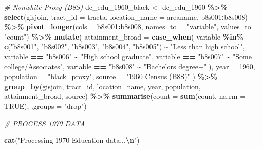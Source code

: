 \documentclass[
]{article}
\newenvironment{Shaded}{\begin{snugshade}}{\end{snugshade}}
\newcommand{\AttributeTok}[1]{\textcolor[rgb]{0.13,0.29,0.53}{#1}}
\newcommand{\CommentTok}[1]{\textcolor[rgb]{0.56,0.35,0.01}{\textit{#1}}}
\newcommand{\ConstantTok}[1]{\textcolor[rgb]{0.56,0.35,0.01}{#1}}
\newcommand{\DecValTok}[1]{\textcolor[rgb]{0.00,0.00,0.81}{#1}}
\newcommand{\FunctionTok}[1]{\textcolor[rgb]{0.13,0.29,0.53}{\textbf{#1}}}
\newcommand{\NormalTok}[1]{#1}
\newcommand{\OtherTok}[1]{\textcolor[rgb]{0.56,0.35,0.01}{#1}}
\newcommand{\SpecialCharTok}[1]{\textcolor[rgb]{0.81,0.36,0.00}{\textbf{#1}}}
\newcommand{\StringTok}[1]{\textcolor[rgb]{0.31,0.60,0.02}{#1}}
\begin{document}
\begin{Shaded}
\begin{Highlighting}[]
\CommentTok{\# Nonwhite Proxy (B8S)}
\NormalTok{dc\_edu\_1960\_black }\OtherTok{\textless{}{-}}\NormalTok{ dc\_edu\_1960 }\SpecialCharTok{\%\textgreater{}\%}
  \FunctionTok{select}\NormalTok{(gisjoin, }\AttributeTok{tract\_id =}\NormalTok{ tracta, }\AttributeTok{location\_name =}\NormalTok{ areaname, b8s001}\SpecialCharTok{:}\NormalTok{b8s008) }\SpecialCharTok{\%\textgreater{}\%}
  \FunctionTok{pivot\_longer}\NormalTok{(}\AttributeTok{cols =}\NormalTok{ b8s001}\SpecialCharTok{:}\NormalTok{b8s008, }\AttributeTok{names\_to =} \StringTok{"variable"}\NormalTok{, }\AttributeTok{values\_to =} \StringTok{"count"}\NormalTok{) }\SpecialCharTok{\%\textgreater{}\%}
  \FunctionTok{mutate}\NormalTok{(}
    \AttributeTok{attainment\_broad =} \FunctionTok{case\_when}\NormalTok{(}
\NormalTok{      variable }\SpecialCharTok{\%in\%} \FunctionTok{c}\NormalTok{(}\StringTok{"b8s001"}\NormalTok{, }\StringTok{"b8s002"}\NormalTok{, }\StringTok{"b8s003"}\NormalTok{, }\StringTok{"b8s004"}\NormalTok{, }\StringTok{"b8s005"}\NormalTok{) }\SpecialCharTok{\textasciitilde{}} \StringTok{"Less than high school"}\NormalTok{,}
\NormalTok{      variable }\SpecialCharTok{==} \StringTok{"b8s006"} \SpecialCharTok{\textasciitilde{}} \StringTok{"High school graduate"}\NormalTok{,}
\NormalTok{      variable }\SpecialCharTok{==} \StringTok{"b8s007"} \SpecialCharTok{\textasciitilde{}} \StringTok{"Some college/Associate\textquotesingle{}s"}\NormalTok{,}
\NormalTok{      variable }\SpecialCharTok{==} \StringTok{"b8s008"} \SpecialCharTok{\textasciitilde{}} \StringTok{"Bachelor\textquotesingle{}s degree+"}
\NormalTok{    ),}
    \AttributeTok{year =} \DecValTok{1960}\NormalTok{, }\AttributeTok{population =} \StringTok{"black\_proxy"}\NormalTok{, }\AttributeTok{source =} \StringTok{"1960 Census (B8S)"}
\NormalTok{  ) }\SpecialCharTok{\%\textgreater{}\%}
  \FunctionTok{group\_by}\NormalTok{(gisjoin, tract\_id, location\_name, year, population, attainment\_broad, source) }\SpecialCharTok{\%\textgreater{}\%}
  \FunctionTok{summarise}\NormalTok{(}\AttributeTok{count =} \FunctionTok{sum}\NormalTok{(count, }\AttributeTok{na.rm =} \ConstantTok{TRUE}\NormalTok{), }\AttributeTok{.groups =} \StringTok{"drop"}\NormalTok{)}


\CommentTok{\# PROCESS 1970 DATA}

\FunctionTok{cat}\NormalTok{(}\StringTok{"Processing 1970 Education data...}\SpecialCharTok{\textbackslash{}n}\StringTok{"}\NormalTok{)}
\end{Highlighting}
\end{Shaded}
\end{document}
